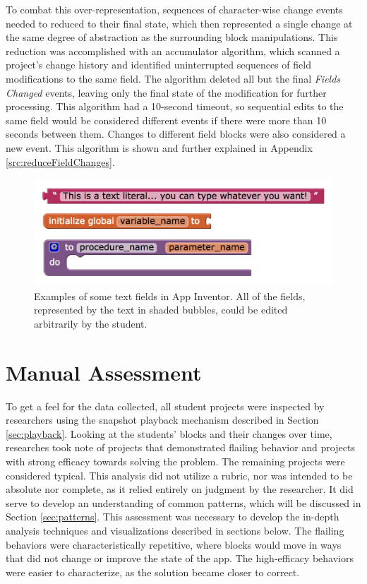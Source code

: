 To combat this over-representation, sequences of character-wise change events needed to reduced to their final state, which then represented a single change at the same degree of abstraction as the surrounding block manipulations. This reduction was accomplished with an accumulator algorithm, which scanned a project's change history and identified uninterrupted sequences of field modifications to the same field. The algorithm deleted all but the final \emph{Fields Changed} events, leaving only the final state of the modification for further processing. This algorithm had a 10-second timeout, so sequential edits to the same field would be considered different events if there were more than 10 seconds between them. Changes to different field blocks were also considered a new event. This algorithm is shown and further explained in Appendix \ref{src:reduceFieldChanges}.

\begin{figure}
  \centering
      \includegraphics[width=\textwidth]{images/ch4-text-fields}
  \caption[Examples of text fields in App Inventor]{Examples of some text fields in App Inventor. All of the fields, represented by the text in shaded bubbles, could be edited arbitrarily by the student.}
  \label{fig:text-fields}
\end{figure}


\section{Manual Assessment}
To get a feel for the data collected, all student projects were inspected by researchers using the snapshot playback mechanism described in Section \ref{sec:playback}. Looking at the students' blocks and their changes over time, researches took note of projects that demonstrated flailing behavior and projects with strong efficacy towards solving the problem. The remaining projects were considered typical. This analysis did not utilize a rubric, nor was intended to be absolute nor complete, as it relied entirely on judgment by the researcher. It did serve to develop an understanding of common patterns, which will be discussed in Section \ref{sec:patterns}. This assessment was necessary to develop the in-depth analysis techniques and visualizations described in sections below. The flailing behaviors were characteristically repetitive, where blocks would move in ways that did not change or improve the state of the app. The high-efficacy behaviors were easier to characterize, as the solution became closer to correct.

